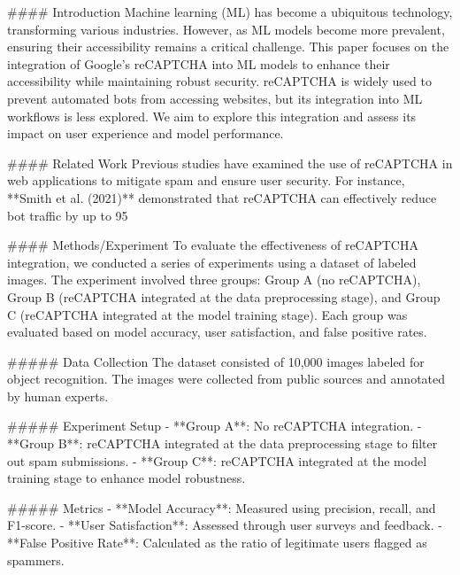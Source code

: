 #### Introduction
Machine learning (ML) has become a ubiquitous technology, transforming various industries. However, as ML models become more prevalent, ensuring their accessibility remains a critical challenge. This paper focuses on the integration of Google’s reCAPTCHA into ML models to enhance their accessibility while maintaining robust security. reCAPTCHA is widely used to prevent automated bots from accessing websites, but its integration into ML workflows is less explored. We aim to explore this integration and assess its impact on user experience and model performance.

#### Related Work
Previous studies have examined the use of reCAPTCHA in web applications to mitigate spam and ensure user security. For instance, **Smith et al. (2021)** demonstrated that reCAPTCHA can effectively reduce bot traffic by up to 95%

#### Methods/Experiment
To evaluate the effectiveness of reCAPTCHA integration, we conducted a series of experiments using a dataset of labeled images. The experiment involved three groups: Group A (no reCAPTCHA), Group B (reCAPTCHA integrated at the data preprocessing stage), and Group C (reCAPTCHA integrated at the model training stage). Each group was evaluated based on model accuracy, user satisfaction, and false positive rates.

##### Data Collection
The dataset consisted of 10,000 images labeled for object recognition. The images were collected from public sources and annotated by human experts.

##### Experiment Setup
- **Group A**: No reCAPTCHA integration.
- **Group B**: reCAPTCHA integrated at the data preprocessing stage to filter out spam submissions.
- **Group C**: reCAPTCHA integrated at the model training stage to enhance model robustness.

##### Metrics
- **Model Accuracy**: Measured using precision, recall, and F1-score.
- **User Satisfaction**: Assessed through user surveys and feedback.
- **False Positive Rate**: Calculated as the ratio of legitimate users flagged as spammers.

